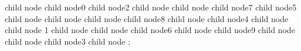 child { node {} %
	child { node{0} } %
	child { node{2} } %
	child { node{} %
		child { node{} } %
		child { node{7} } %
		child { node{5} } %
		child { node{} } } %
	child { node{} } } %
child { node{} }%
child { node{8} }%
child { node{} %
	child { node{4} } %
	child { node{} %
		child { node {1} } %
		child { node {} } %
		child { node {} %
			child { node{6} } %
			child { node{} } %
			child { node{9} } %
			child { node{} } %
		}
		child { node {} } }%
	child { node{3} } %
	child{ node{} } }; %